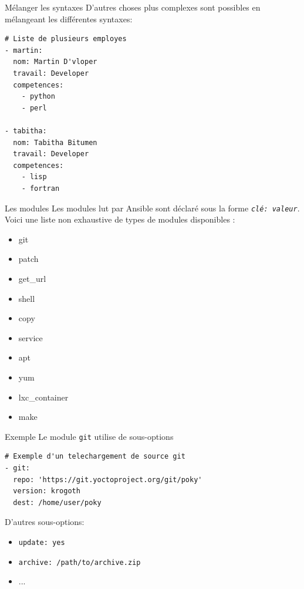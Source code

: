 \documentclass[compress]{smilebeamer}
\begin{document}
\begin{frame}[fragile]{Mélanger les syntaxes}
D’autres choses plus complexes sont possibles en mélangeant les différentes syntaxes:
\begin{lstlisting}[style=bitbake]
# Liste de plusieurs employes
- martin:
  nom: Martin D'vloper
  travail: Developer
  competences:
    - python
    - perl

- tabitha:
  nom: Tabitha Bitumen
  travail: Developer
  competences:
    - lisp
    - fortran
\end{lstlisting}
\end{frame}


\begin{frame}[fragile]{Les modules}
Les modules lut par Ansible sont déclaré sous la forme \textit{\texttt{clé: valeur}}.\newline
Voici une liste non exhaustive de types de modules disponibles :
\begin{multicols}{2}
\begin{itemize}
	\item git
	\item patch
	\item get\_url
	\item shell
	\item copy
	\item service
	\item apt
	\item yum
	\item lxc\_container
	\item make
\end{itemize}
\end{multicols}
\end{frame}


\begin{frame}[fragile]{Exemple}
Le module \texttt{git} utilise de sous-options
\begin{lstlisting}[style=bitbake]
# Exemple d'un telechargement de source git
- git:
  repo: 'https://git.yoctoproject.org/git/poky'
  version: krogoth
  dest: /home/user/poky
\end{lstlisting}
D'autres sous-options:
\begin{itemize}
	\item \texttt{update: yes}
	\item \texttt{archive: /path/to/archive.zip}
	\item ...
\end{itemize}
\end{frame}
\end{document}
